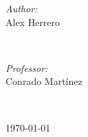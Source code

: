 \begin{titlepage}
\begin{minipage}{0.4\textwidth}
\begin{flushleft} \large
\emph{Author:}\\
Alex Herrero \\
\end{flushleft}
\end{minipage}
~
\begin{minipage}{0.4\textwidth}
\begin{flushright} \large
\emph{Professor:} \\
Conrado Martínez
\end{flushright}
\end{minipage}\\[2cm]
\makeatother


\vspace{8cm}
{\large \today}\\[1cm] %

\vfill %

\end{titlepage}
